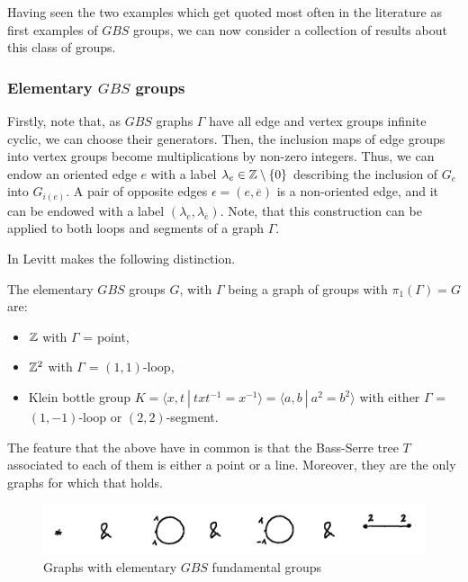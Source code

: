 Having seen the two examples which get quoted most often in the literature as first examples of $GBS$ groups, we can now consider a collection of results about this class of groups.

\subsubsection{Elementary $GBS$ groups} \label{labelledGBSgraph}
Firstly, note that, as $GBS$ graphs $\Gamma$ have all edge and vertex groups infinite cyclic, we can choose their generators. Then, the inclusion maps of edge groups into vertex groups become multiplications by non-zero integers. Thus, we can endow an oriented edge $e$ with a label $\lambda_e \in \mathbb{Z} \setminus \{0\}$ describing the inclusion of $G_e$ into $G_{i(e)}$. A pair of opposite edges $\epsilon = (e,\overline{e})$ is a non-oriented edge, and it can be endowed with a label $(\lambda_e,\lambda_{\overline{e}})$. Note, that this construction can be applied to both loops and segments of a graph $\Gamma$.

In \cite{Le07} Levitt makes the following distinction.

\begin{remark} \label{elemlinegbs}
    The elementary $GBS$ groups $G$, with $\Gamma$ being a graph of groups with $\pi_1(\Gamma) = G$ are:
    \begin{itemize}
        \item $\mathbb{Z}$ with $\Gamma$ = point,
        \item $\mathbb{Z}^2$ with $\Gamma$ = $(1,1)$-loop,
        \item Klein bottle group $K = \langle x,t \: | \: txt^{-1} = x^{-1} \rangle = \langle a,b \: | \: a^2 = b^2\rangle$ with either $\Gamma$ = $(1,-1)$-loop or $(2,2)$-segment.
    \end{itemize}
    The feature that the above have in common is that the Bass-Serre tree $T$ associated to each of them is either a point or a line. Moreover, they are the only graphs for which that holds.
\end{remark}

\begin{figure}[h]
    \centering
    \includegraphics[scale = 0.15]{sections/alicja/Elementary graphs.jpeg}
    \caption{Graphs with elementary $GBS$ fundamental groups}
    \label{elementarygraphs}
\end{figure}

